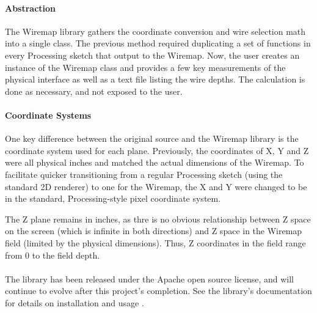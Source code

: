 \paragraph{Abstraction}
The Wiremap library gathers the coordinate conversion and wire selection math into a single class. The previous method required duplicating a set of functions in every Processing sketch that output to the Wiremap. Now, the user creates an instance of the Wiremap class and provides a few key measurements of the physical interface as well as a text file listing the wire depths. The calculation is done as necessary, and not exposed to the user.

\paragraph{Coordinate Systems}
One key difference between the original source and the Wiremap library is the coordinate system used for each plane. Previously, the coordinates of X, Y and Z were all physical inches and matched the actual dimensions of the Wiremap. To facilitate quicker transitioning from a regular Processing sketch (using the standard 2D renderer) to one for the Wiremap, the X and Y were changed to be in the standard, Processing-style pixel coordinate system.

The Z plane remains in inches, as thre is no obvious relationship between Z space on the screen (which is infinite in both directions) and Z space in the Wiremap field (limited by the physical dimensions). Thus, Z coordinates in the field range from 0 to the field depth.

\paragraph{}The library has been released under the Apache open source license, and will continue to evolve after this project's completion. See the library's documentation for details on installation and usage \cite{CP}.
